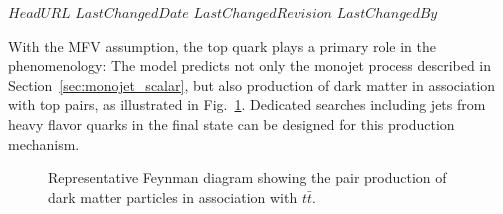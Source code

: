 \svnidlong
{$HeadURL$}
{$LastChangedDate$}
{$LastChangedRevision$}
{$LastChangedBy$}

With the MFV assumption, the top quark plays a primary role in the phenomenology: The model predicts not only
the monojet process described in Section~\ref{sec:monojet_scalar}, but also production of dark matter
in association with top pairs, as illustrated in Fig.~\ref{fig:TTbarPhi}. 
Dedicated searches including jets from heavy flavor quarks in the final state
can be designed for this production mechanism. 

\begin{figure}[h!]
\centering
  \textwidth
  \begin{feynmandiagram}[modelTTbarMET]
  \end{feynmandiagram}
\caption{Representative Feynman
diagram showing the pair production of dark matter particles in
association with $t\bar t$.}
\label{fig:TTbarPhi}
\end{figure}





